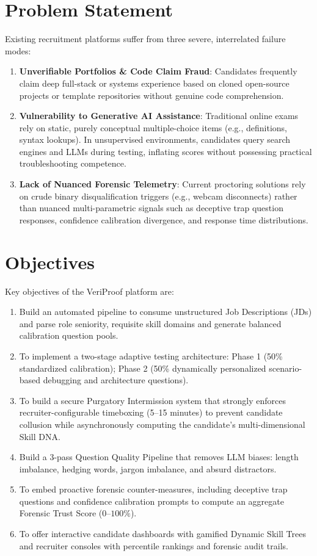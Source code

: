 \section{Problem Statement}
Existing recruitment platforms suffer from three severe, interrelated failure modes:
\begin{enumerate}
    \item \textbf{Unverifiable Portfolios \& Code Claim Fraud}: Candidates frequently claim deep full-stack or systems experience based on cloned open-source projects or template repositories without genuine code comprehension.
    \item \textbf{Vulnerability to Generative AI Assistance}: Traditional online exams rely on static, purely conceptual multiple-choice items (e.g., definitions, syntax lookups). In unsupervised environments, candidates query search engines and LLMs during testing, inflating scores without possessing practical troubleshooting competence.
    \item \textbf{Lack of Nuanced Forensic Telemetry}: Current proctoring solutions rely on crude binary disqualification triggers (e.g., webcam disconnects) rather than nuanced multi-parametric signals such as deceptive trap question responses, confidence calibration divergence, and response time distributions.
\end{enumerate}

\section{Objectives}
Key objectives of the VeriProof platform are:
\begin{enumerate}
    \item Build an automated pipeline to consume unstructured Job Descriptions (JDs) and parse role seniority, requisite skill domains and generate balanced calibration question pools.
    \item To implement a two-stage adaptive testing architecture: Phase 1 (50\% standardized calibration); Phase 2 (50\% dynamically personalized scenario-based debugging and architecture questions).
    \item To build a secure Purgatory Intermission system that strongly enforces recruiter-configurable timeboxing (5--15 minutes) to prevent candidate collusion while asynchronously computing the candidate's multi-dimensional Skill DNA.
    \item Build a 3-pass Question Quality Pipeline that removes LLM biases: length imbalance, hedging words, jargon imbalance, and absurd distractors.
    \item To embed proactive forensic counter-measures, including deceptive trap questions and confidence calibration prompts to compute an aggregate Forensic Trust Score ($0$--$100\%$).
    \item To offer interactive candidate dashboards with gamified Dynamic Skill Trees and recruiter consoles with percentile rankings and forensic audit trails.
\end{enumerate}


